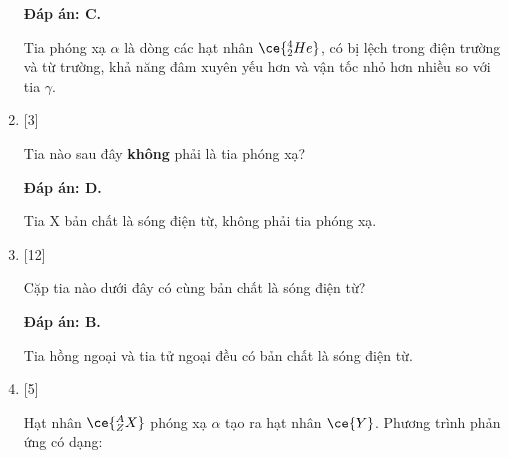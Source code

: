 \begin{enumerate}[label=\bfseries Câu \arabic*:]
	\loigiai
	{		\textbf{Đáp án: C.}
		
		Tia phóng xạ $\alpha$ là dòng các hạt nhân $\ce{^4_2 He}$, có bị lệch trong điện trường và từ trường, khả năng đâm xuyên yếu hơn và vận tốc nhỏ hơn nhiều so với tia $\gamma$.
		
	}
	
	\item {} [3]
	\cauhoi
	{Tia nào sau đây \textbf{không} phải là tia phóng xạ?
	}
	
	\loigiai
	{		\textbf{Đáp án: D.}
		
		Tia X bản chất là sóng điện từ, không phải tia phóng xạ.
		
	}
	\item {} [12]
	\cauhoi
	{Cặp tia nào dưới đây có cùng bản chất là sóng điện từ?
	}
	
	\loigiai
	{		\textbf{Đáp án: B.}
		
		Tia hồng ngoại và tia tử ngoại đều có bản chất là sóng điện từ.
		
	}
	\item {} [5]
	\cauhoi
	{Hạt nhân $\ce{^A_Z X}$ phóng xạ $\alpha$ tạo ra hạt nhân $\ce{Y}$. Phương trình phản ứng có dạng:
	}
	

\end{enumerate}
